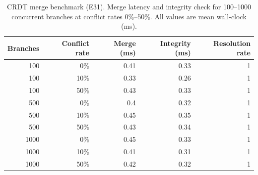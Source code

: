 \begin{table}[htbp]
\centering
\footnotesize
\caption{CRDT merge benchmark (E31). Merge latency and integrity check for 100--1000 concurrent branches at conflict rates 0\%--50\%. All values are mean wall-clock (ms).}
\label{tab:e31-results}
\begin{tabular}{@{}rrrrr@{}}
\toprule
\textbf{Branches} & \textbf{Conflict rate} & \textbf{Merge (ms)} & \textbf{Integrity (ms)} & \textbf{Resolution rate} \\
\midrule
100 & 0\% & 0.41 & 0.33 & 1 \\
100 & 10\% & 0.33 & 0.26 & 1 \\
100 & 50\% & 0.43 & 0.33 & 1 \\
500 & 0\% & 0.4 & 0.32 & 1 \\
500 & 10\% & 0.45 & 0.35 & 1 \\
500 & 50\% & 0.43 & 0.34 & 1 \\
1000 & 0\% & 0.45 & 0.33 & 1 \\
1000 & 10\% & 0.41 & 0.31 & 1 \\
1000 & 50\% & 0.42 & 0.32 & 1 \\
\bottomrule
\end{tabular}
\end{table}
